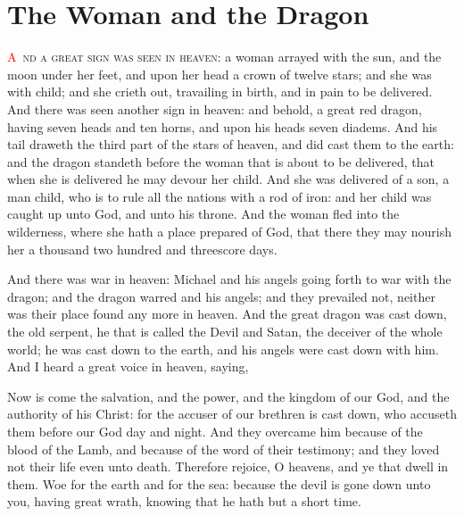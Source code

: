 
\chapter{The Woman and the Dragon}
\lettrine[lines=3,slope=0.5em]{\textcolor{red}{A}}{\ nd a great sign was seen in heaven}:%
 a woman arrayed with the sun, and the moon under her feet, and upon her head a crown of twelve stars; 
 and she was with child; and she crieth out, travailing in birth, and in pain to be delivered. 
 And there was seen another sign in heaven: and behold, a great red dragon, having seven heads and ten horns, and upon his heads seven diadems. 
 And his tail draweth the third part of the stars of heaven, and did cast them to the earth: and the dragon standeth before the woman that is about to be delivered, that when she is delivered he may devour her child. 
 And she was delivered of a son, a man child, who is to rule all the nations with a rod of iron: and her child was caught up unto God, and unto his throne. 
 And the woman fled into the wilderness, where she hath a place prepared of God, that there they may nourish her a thousand two hundred and threescore days.

 And there was war in heaven: Michael and his angels going forth to war with the dragon; and the dragon warred and his angels; 
 and they prevailed not, neither was their place found any more in heaven. 
 And the great dragon was cast down, the old serpent, he that is called the Devil and Satan, the deceiver of the whole world; he was cast down to the earth, and his angels were cast down with him. 
 And I heard a great voice in heaven, saying,

Now is come the salvation, and the power, and the kingdom of our God, and the authority of his Christ: for the accuser of our brethren is cast down, who accuseth them before our God day and night. 
 And they overcame him because of the blood of the Lamb, and because of the word of their testimony; and they loved not their life even unto death. 
 Therefore rejoice, O heavens, and ye that dwell in them. Woe for the earth and for the sea: because the devil is gone down unto you, having great wrath, knowing that he hath but a short time.


